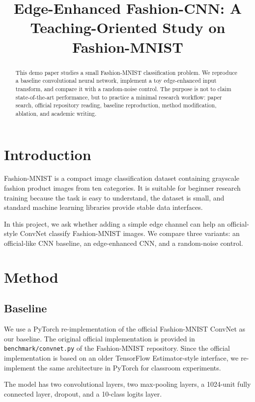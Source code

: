 \documentclass[10pt,conference]{IEEEtran}
\title{Edge-Enhanced Fashion-CNN: A Teaching-Oriented Study on Fashion-MNIST}
\author{
\IEEEauthorblockN{Student Name}
\IEEEauthorblockA{Course Demo Project}
}
\begin{document}
\maketitle

\begin{abstract}
This demo paper studies a small Fashion-MNIST classification problem. We reproduce a baseline convolutional neural network, implement a toy edge-enhanced input transform, and compare it with a random-noise control. The purpose is not to claim state-of-the-art performance, but to practice a minimal research workflow: paper search, official repository reading, baseline reproduction, method modification, ablation, and academic writing.
\end{abstract}

\section{Introduction}

Fashion-MNIST is a compact image classification dataset containing grayscale fashion product images from ten categories. It is suitable for beginner research training because the task is easy to understand, the dataset is small, and standard machine learning libraries provide stable data interfaces.

In this project, we ask whether adding a simple edge channel can help an official-style ConvNet classify Fashion-MNIST images. We compare three variants: an official-like CNN baseline, an edge-enhanced CNN, and a random-noise control.

\section{Method}

\subsection{Baseline}

We use a PyTorch re-implementation of the official Fashion-MNIST ConvNet as our baseline. The original official implementation is provided in \texttt{benchmark/convnet.py} of the Fashion-MNIST repository. Since the official implementation is based on an older TensorFlow Estimator-style interface, we re-implement the same architecture in PyTorch for classroom experiments.

The model has two convolutional layers, two max-pooling layers, a 1024-unit fully connected layer, dropout, and a 10-class logits layer.
\end{document}
